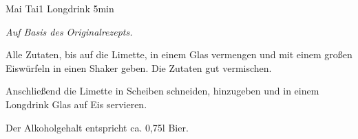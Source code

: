 \documentclass[../recipe-collections/cocktails.tex]{subfiles}
\begin{document}
\begin{recipe}{Mai Tai}{1 Longdrink }{5min }

  \freeform{}\textit{Auf Basis des Originalrezepts.}


  Alle Zutaten, bis auf die Limette, in einem Glas vermengen und mit einem großen Eiswürfeln in einen Shaker geben.
  Die Zutaten gut vermischen.


  Anschließend die Limette in Scheiben schneiden, hinzugeben und in einem Longdrink Glas auf Eis servieren.

  \freeform{}\hrulefill{}

  \freeform{}
  Der Alkoholgehalt entspricht ca. 0,75l Bier.

\end{recipe}
\end{document}
